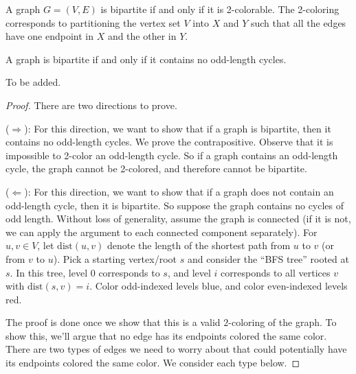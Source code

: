\begin{note} \label{note:2-colorability-is-equivalent-to-bipartiteness}
A graph $G=(V,E)$ is bipartite if and only if it is 2-colorable. The 2-coloring corresponds to partitioning the vertex set $V$ into $X$ and $Y$ such that all the edges have one endpoint in $X$ and the other in $Y$.
\end{note}


\begin{flex}
\begin{theorem} \label{theorem:Characterization-of-bipartite-graphs}
A graph is bipartite if and only if it contains no odd-length cycles.
\end{theorem}

\begin{gram}
To be added.
\end{gram}

\begin{proof}
There are two directions to prove.

\noindent
($\Longrightarrow$): For this direction, we want to show that if a graph is bipartite, then it contains no odd-length cycles. We prove the contrapositive. Observe that it is impossible to 2-color an odd-length cycle. So if a graph contains an odd-length cycle, the graph cannot be 2-colored, and therefore cannot be bipartite.

\noindent
($\Longleftarrow$): For this direction, we want to show that if a graph does not contain an odd-length cycle, then it is bipartite. So suppose the graph contains no cycles of odd length. Without loss of generality, assume the graph is connected (if it is not, we can apply the argument to each connected component separately). For $u,v \in V$, let $\text{dist}(u,v)$ denote the length of the shortest path from $u$ to $v$ (or from $v$ to $u$). Pick a starting vertex/root $s$ and consider the ``BFS tree'' rooted at $s$. In this tree, level 0 corresponds to $s$, and level $i$ corresponds to all vertices $v$ with $\text{dist}(s,v) = i$. Color odd-indexed levels blue, and color even-indexed levels red. 

The proof is done once we show that this is a valid $2$-coloring of the graph. To show this, we'll argue that no edge has its endpoints colored the same color. There are two types of edges we need to worry about that could potentially have its endpoints colored the same color. We consider each type below.


\end{proof}
\end{flex}
